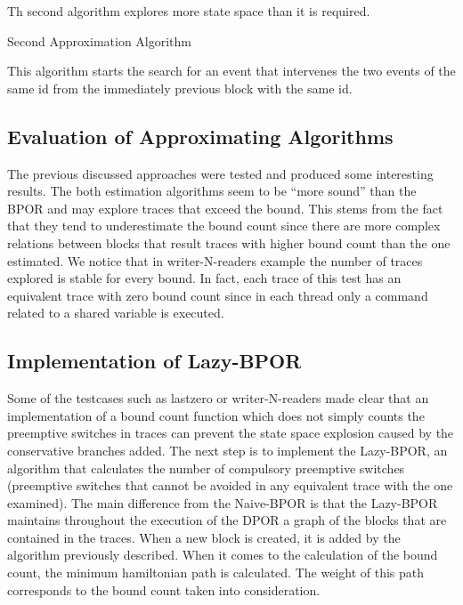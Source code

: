 Th second algorithm explores more state space than it is required.\\

\begin{algorithm}[H]
    \caption{Second Approximation Algorithm}
\end{algorithm}

This algorithm starts the search for an event that intervenes the two events of the same id from the immediately previous block 
with the same id. 

\subsection{Evaluation of Approximating Algorithms}
The previous discussed approaches were tested and produced some interesting results. The both estimation algorithms seem
to be ``more sound'' than the BPOR and may explore traces that exceed the bound. This stems from the fact that they tend
to underestimate the bound count since there are more complex relations between blocks that result traces with higher
bound count than the one estimated. We notice that in writer-N-readers example the number of traces explored is stable
for every bound. In fact, each trace of this test has an equivalent trace with zero bound count since in each thread
only a command related to a shared variable is executed.


\subsection{Implementation of Lazy-BPOR}

Some of the testcases such as lastzero or writer-N-readers made clear that an implementation of a bound count function
which does not simply counts the preemptive switches in traces can prevent the state space explosion caused by the
conservative branches added. The next step is to implement the Lazy-BPOR, an algorithm that calculates the number of
compulsory preemptive switches (preemptive switches that cannot be avoided in any equivalent trace with the one
examined). The main difference from the Naive-BPOR is that the Lazy-BPOR maintains throughout the execution of the DPOR
a graph of the blocks that are contained in the traces. When a new block is created, it is added by the algorithm
previously described. When it comes to the calculation of the bound count, the minimum hamiltonian path is calculated.
The weight of this path corresponds to the bound count taken into consideration.

